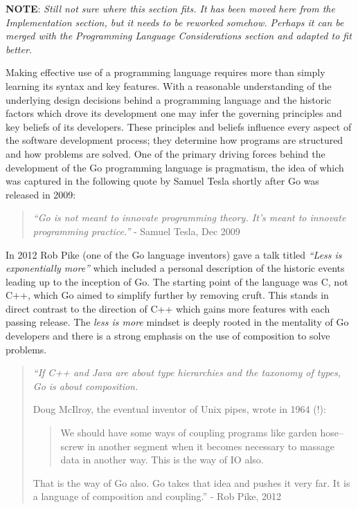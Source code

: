 
\textbf{NOTE}: \textit{Still not sure where this section fits. It has been moved here from the Implementation section, but it needs to be reworked somehow. Perhaps it can be merged with the Programming Language Considerations section and adapted to fit better.}

Making effective use of a programming language requires more than simply learning its syntax and key features. With a reasonable understanding of the underlying design decisions behind a programming language and the historic factors which drove its development one may infer the governing principles and key beliefs of its developers. These principles and beliefs influence every aspect of the software development process; they determine how programs are structured and how problems are solved. One of the primary driving forces behind the development of the Go programming language is pragmatism, the idea of which was captured in the following quote by Samuel Tesla shortly after Go was released in 2009:

\begin{quote}
	\textit{``Go is not meant to innovate programming theory. It's meant to innovate programming practice.''} - Samuel Tesla, Dec 2009 \cite{pragmatic}
\end{quote}

In 2012 Rob Pike (one of the Go language inventors) gave a talk titled \textit{``Less is exponentially more''} which included a personal description of the historic events leading up to the inception of Go. The starting point of the language was C, not C++, which Go aimed to simplify further by removing cruft. This stands in direct contrast to the direction of C++ which gains more features with each passing release. The \textit{less is more} mindset is deeply rooted in the mentality of Go developers and there is a strong emphasis on the use of composition to solve problems.

\begin{quote}
	\itshape
	``If C++ and Java are about type hierarchies and the taxonomy of types, Go is about composition.

	Doug McIlroy, the eventual inventor of Unix pipes, wrote in 1964 (!):

	\begin{quote}
		We should have some ways of coupling programs like garden hose--screw in another segment when it becomes necessary to massage data in another way. This is the way of IO also.
	\end{quote}

	That is the way of Go also. Go takes that idea and pushes it very far. It is a language of composition and coupling.''
	\normalfont
	- Rob Pike, 2012 \cite{less_is_more}
\end{quote}

